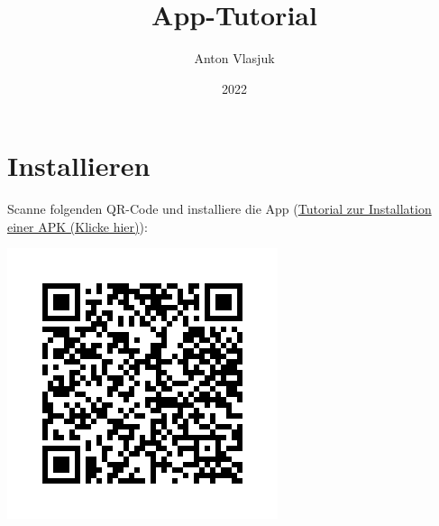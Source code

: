 \documentclass{article}
\title{App-Tutorial}
\author{Anton Vlasjuk}
\date{2022}
\begin{document}
\maketitle
\tableofcontents

\clearpage

\section{Installieren}
Scanne folgenden QR-Code und installiere die App (\href{https://www.heise.de/tipps-tricks/Externe-Apps-APK-Dateien-bei-Android-installieren-so-klappt-s-3714330.html}{Tutorial zur Installation einer APK (Klicke hier)}):
\vfill
\begin{center}
    \includegraphics[scale=0.6]{frame.png}
\end{center}
\vfill
\newpage
\end{document}
